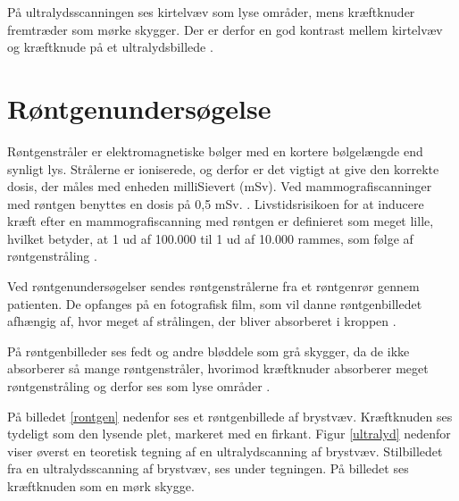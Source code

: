 På ultralydsscanningen ses kirtelvæv som lyse områder, mens kræftknuder fremtræder som mørke skygger. Der er derfor en god kontrast mellem kirtelvæv og kræftknude på et ultralydsbillede \cite{Ultralyd}.

\section{Røntgenundersøgelse}
Røntgenstråler er elektromagnetiske bølger med en kortere bølgelængde end synligt lys. Strålerne er ioniserede, og derfor er det vigtigt at give den korrekte dosis, der måles med enheden milliSievert (mSv). Ved mammografiscanninger med røntgen benyttes en dosis på 0,5 mSv. \cite{Sundhedsstyrelsen}. Livstidsrisikoen for at inducere kræft efter en mammografiscanning med røntgen er definieret som meget lille, hvilket betyder, at 1 ud af 100.000 til 1 ud af 10.000 rammes, som følge af røntgenstråling \cite{Risk}. 

Ved røntgenundersøgelser sendes røntgenstrålerne fra et røntgenrør gennem patienten. De opfanges på en fotografisk film, som vil danne røntgenbilledet afhængig af, hvor meget af strålingen, der bliver absorberet i kroppen \cite{Rontgenundersogelse}.

På røntgenbilleder ses fedt og andre bløddele som grå skygger, da de ikke absorberer så mange røntgenstråler, hvorimod kræftknuder absorberer meget røntgenstråling og derfor ses som lyse områder \cite{Rontgenundersogelse}.
\newpage

På billedet \ref{rontgen} nedenfor ses et røntgenbillede af brystvæv. Kræftknuden ses tydeligt som den lysende plet, markeret med en firkant. Figur \ref{ultralyd} nedenfor viser øverst en teoretisk tegning af en ultralydscanning af brystvæv. Stilbilledet fra en ultralydsscanning af brystvæv, ses under tegningen. På billedet ses kræftknuden som en mørk skygge. 


